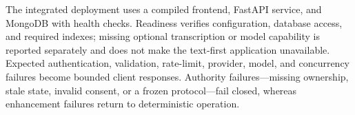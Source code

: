 The integrated deployment uses a compiled frontend, FastAPI service, and MongoDB with health checks. Readiness verifies configuration, database access, and required indexes; missing optional transcription or model capability is reported separately and does not make the text-first application unavailable. Expected authentication, validation, rate-limit, provider, model, and concurrency failures become bounded client responses. Authority failures---missing ownership, stale state, invalid consent, or a frozen protocol---fail closed, whereas enhancement failures return to deterministic operation.
\label{subsec:health-failure-handling}

\label{sec:implementation-verification}
\label{subsec:performance-testing}

